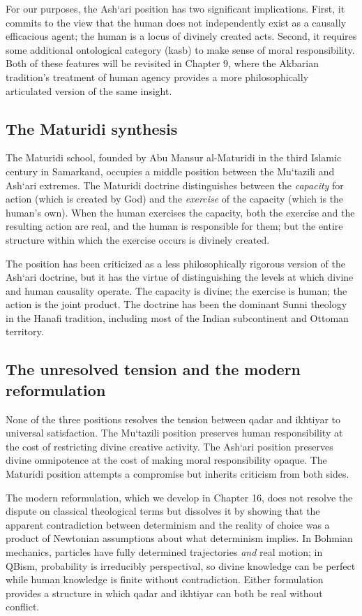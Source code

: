 For our purposes, the Ash`ari position has two significant
implications. First, it commits to the view that the human does not
independently exist as a causally efficacious agent; the human is a
locus of divinely created acts. Second, it requires some additional
ontological category (kasb) to make sense of moral responsibility.
Both of these features will be revisited in Chapter 9, where the
Akbarian tradition's treatment of human agency provides a more
philosophically articulated version of the same insight.

\subsection{The Maturidi synthesis}

The Maturidi school, founded by Abu Mansur al-Maturidi in the third
Islamic century in Samarkand, occupies a middle position between
the Mu`tazili and Ash`ari extremes. The Maturidi doctrine
distinguishes between the \emph{capacity} for action (which is
created by God) and the \emph{exercise} of the capacity (which is
the human's own). When the human exercises the capacity, both the
exercise and the resulting action are real, and the human is
responsible for them; but the entire structure within which the
exercise occurs is divinely created.

The position has been criticized as a less philosophically rigorous
version of the Ash`ari doctrine, but it has the virtue of
distinguishing the levels at which divine and human causality
operate. The capacity is divine; the exercise is human; the action
is the joint product. The doctrine has been the dominant Sunni
theology in the Hanafi tradition, including most of the Indian
subcontinent and Ottoman territory.

\subsection{The unresolved tension and the modern reformulation}

None of the three positions resolves the tension between qadar and
ikhtiyar to universal satisfaction. The Mu`tazili position
preserves human responsibility at the cost of restricting divine
creative activity. The Ash`ari position preserves divine omnipotence
at the cost of making moral responsibility opaque. The Maturidi
position attempts a compromise but inherits criticism from both
sides.

The modern reformulation, which we develop in Chapter 16, does not
resolve the dispute on classical theological terms but dissolves it
by showing that the apparent contradiction between determinism and
the reality of choice was a product of Newtonian assumptions about
what determinism implies. In Bohmian mechanics, particles have fully
determined trajectories \emph{and} real motion; in QBism, probability
is irreducibly perspectival, so divine knowledge can be perfect
while human knowledge is finite without contradiction. Either
formulation provides a structure in which qadar and ikhtiyar can
both be real without conflict.

